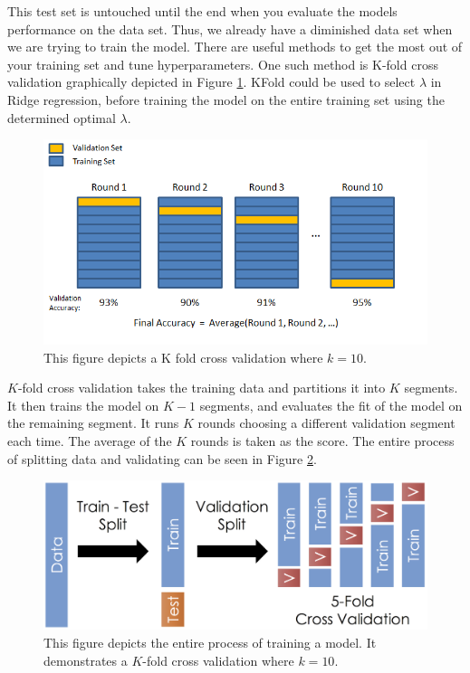 \documentclass[12pt]{article}
\begin{document}
This test set is untouched until the end when you evaluate the models performance on the data set. Thus, we already have a diminished data set when we are trying to train the model. There are useful methods to get the most out of your training set and tune hyperparameters. One such method is K-fold cross validation graphically depicted in Figure \ref{kfold}. KFold could be used to select $\lambda$ in Ridge regression, before training the model on the entire training set using the determined optimal $\lambda$.

\begin{figure}[ht]
	\centering
	\includegraphics[width=.5\textwidth]{kfold.png}
	\caption{This figure depicts a K fold cross validation where $k=10$. \cite{kfold}}
	\label{kfold}
\end{figure}

$K$-fold cross validation takes the training data and partitions it into $K$ segments. It then trains the model on $K-1$ segments, and evaluates the fit of the model on the remaining segment. It runs $K$ rounds choosing a different validation segment each time. The average of the $K$ rounds is taken as the score. The entire process of splitting data and validating can be seen in Figure \ref{test_train_validate}.

\begin{figure}[ht]
	\centering
	\includegraphics[width=.5\textwidth]{test_train_validate.png}
	\caption{This figure depicts the entire process of training a model. It demonstrates a $K$-fold cross validation where $k=10$. \cite{kfold2}}
	\label{test_train_validate}
\end{figure}

\clearpage 


\end{document}
